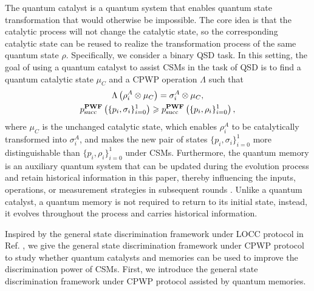 \documentclass[aps,pra,twocolumn,floatfix,amsfonts,10pt]{revtex4-2}
\begin{document}
The quantum catalyst is a quantum system that enables quantum state transformation that would otherwise be impossible. 
The core idea is that the catalytic process will not change the catalytic state, so the corresponding catalytic state can be reused to realize the transformation process of the same quantum state $\rho$.
Specifically, we consider a binary QSD task. 
In this setting, the goal of using a quantum catalyst to assist CSMs in the task of QSD is to find a quantum catalytic state $\mu_C$ and a CPWP operation $\Lambda$ such that
\begin{gather}
	\Lambda \left( \rho_i^A \otimes \mu_C \right) = \sigma_i^A \otimes \mu_C, \\ p_{\rm{succ}}^{\mathbf{PWF}}\left(\{p_i,\sigma_i\}_{i=0}^1\right) \geqslant p_{\rm{succ}}^{\mathbf{PWF}}\left(\{p_i,\rho_i\}_{i=0}^1\right),
\end{gather}
where $\mu_C$ is the unchanged catalytic state, which enables $\rho_i^A$ to be catalytically transformed into $\sigma_i^A$, and makes the new pair of states $\{p_i,\sigma_i\}_{i=0}^1$ more distinguishable than $\{p_i,\rho_i\}_{i=0}^1$ under CSMs.
Furthermore, the quantum memory is an auxiliary quantum system that can be updated during the evolution process and retain historical information in this paper, thereby influencing the inputs, operations, or measurement strategies in subsequent rounds \cite{CDP2008}. 
Unlike a quantum catalyst, a quantum memory is not required to return to its initial state, instead, it evolves throughout the process and carries historical information.

Inspired by the general state discrimination framework under LOCC protocol in Ref. \cite{PS2025}, we give the general state discrimination framework under CPWP protocol to study whether quantum catalysts and memories can be used to improve the discrimination power of CSMs.
First, we introduce the general state discrimination framework under CPWP protocol assisted by quantum memories.
\end{document}
